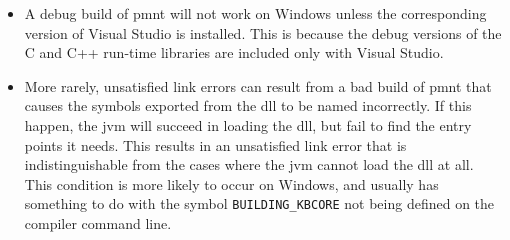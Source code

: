 \begin{itemize}
	\item A debug build of \ac{pmnt} will not work on Windows unless the corresponding version of Visual Studio is installed.  This is because the debug versions of the C and C++ run-time libraries are included only with Visual Studio.

	\item More rarely, unsatisfied link errors can result from a bad build of \ac{pmnt} that causes the symbols exported from the \ac{dll} to be named incorrectly.  If this happen, the \ac{jvm} will succeed in loading the \ac{dll}, but fail to find the entry points it needs.  This results in an unsatisfied link error that is indistinguishable from the cases where the \ac{jvm} cannot load the \ac{dll} at all.  This condition is more likely to occur on Windows, and usually has something to do with the symbol \verb|BUILDING_KBCORE| not being defined on the compiler command line.
\end{itemize}
